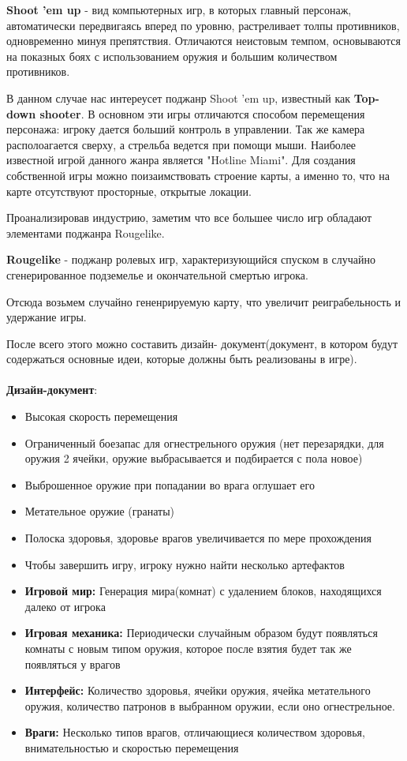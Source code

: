 \documentclass[14pt, titlepage,fleqn,a4paper]{extarticle}
\begin{document}
\textbf{Shoot 'em up} - вид компьютерных игр, в которых главный персонаж, автоматически передвигаясь вперед по уровню, растреливает толпы противников, одновременно минуя препятствия. Отличаются неистовым темпом, основываются на показных боях с использованием оружия и большим количеством противников. 

В данном случае нас интереусет поджанр Shoot 'em up, известный как \textbf{Top-down shooter}. В основном эти игры отличаются способом перемещения персонажа: игроку дается больший контроль в управлении. Так же камера располоагается сверху, а стрельба ведется при помощи мыши. Наиболее известной игрой данного жанра является "Hotline Miami". Для создания собственной игры можно поизаимствовать строение карты, а именно то, что на карте отсутствуют просторные, открытые локации.

Проанализировав индустрию, заметим что все большее число игр обладают элементами поджанра Rougelike.

\textbf{Rougelike} - поджанр ролевых игр, характеризующийся спуском в случайно сгенерированное подземелье и окончательной смертью игрока.

Отсюда возьмем случайно     гененрируемую карту, что увеличит реиграбельность и удержание игры.

После всего этого можно составить дизайн- документ(документ, в котором будут содержаться основные идеи, которые должны быть реализованы в игре).
\\
\\
{\bfseries Дизайн-документ}:
\begin{itemize}
	\item Высокая скорость перемещения
	\item Ограниченный боезапас для огнестрельного оружия (нет перезарядки, для оружия 2 ячейки, оружие выбрасывается и подбирается с пола новое)
	\item Выброшенное оружие при попадании во врага оглушает его
	\item Метательное оружие (гранаты)
	\item Полоска здоровья, здоровье врагов увеличивается по мере прохождения
    \item Чтобы завершить игру, игроку нужно найти несколько артефактов

	\item \textbf{Игровой мир:}
	Генерация мира(комнат) с удалением блоков, находящихся далеко от игрока 

	\item \textbf{Игровая механика:}
	Периодически случайным образом будут появляться комнаты с новым типом оружия, которое после взятия будет так же появляться у врагов

	\item \textbf{Интерфейс:}
	Количество здоровья, ячейки оружия, ячейка метательного оружия, количество патронов в выбранном оружии, если оно огнестрельное.

	\item \textbf{Враги:}
	Несколько типов врагов, отличающиеся количеством здоровья, внимательностью и скоростью перемещения
\end{itemize}
\newpage
\end{document}

